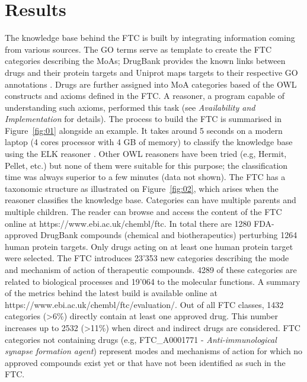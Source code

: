 \documentclass{bioinfo}
\begin{document}
\section{Results}

The knowledge base behind the FTC is built by integrating information coming from various sources. 
The GO terms serve as template to create the FTC categories describing the MoAs; DrugBank \citep{Knox2011} provides the 
known links between drugs and their protein targets and Uniprot \citep{TheUniprotConsortium2013} maps targets to their 
respective GO annotations \citep{Dimmer2012}. 
Drugs are further assigned into MoA categories based of the OWL constructs and axioms defined in the 
FTC. A reasoner, a program capable of understanding such axioms, performed this task (see \emph{Availability and Implementation} for details). 
The process to build the FTC is summarised in Figure~\ref{fig:01} alongside an example.
It takes around 5 seconds on a modern 
laptop (4 cores processor with 4 GB of memory) to classify the knowledge base using the ELK reasoner \citep{Kazakov2011}. 
Other OWL reasoners have been tried (e.g, Hermit, Pellet, etc.) but none of them were suitable for this purpose; 
the classification time was always superior to a few minutes (data not shown). The FTC has a taxonomic structure as illustrated 
on Figure~\ref{fig:02}, which arises when the reasoner classifies the knowledge base. Categories can have multiple parents and multiple children. 
The reader can browse and access the content of the FTC online at {{https://www.ebi.ac.uk/chembl/ftc}}.
In total there are 1280 FDA-approved DrugBank compounds (chemical and biotherapeutics) perturbing 1264 human protein targets.
Only drugs acting on at least one human protein target were selected.
The FTC introduces 23'353 new categories describing the mode and mechanism of action of therapeutic compounds. 4289 of these 
categories are related to biological processes and 19'064 to the molecular functions. A summary of the metrics behind the latest 
build is available online at {{https://www.ebi.ac.uk/chembl/ftc/evaluation/}}.
Out of all FTC classes, 1432 
categories (\textgreater 6\%) directly contain at least one approved drug. This number increases up to 2532 (\textgreater 11\%) 
when direct and 
indirect drugs are considered. FTC categories not containing drugs (e.g, FTC\_A0001771 - \emph{Anti-immunological synapse 
formation agent}) represent modes and mechanisms of action for which no approved compounds exist yet or that have not been identified 
as such in the FTC.
\end{document}
